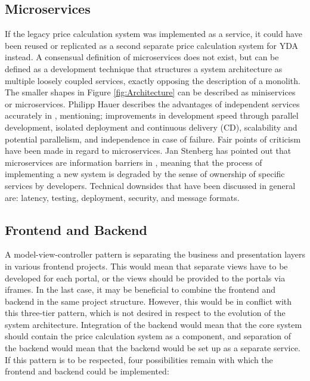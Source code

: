 \subsection{Microservices}


If the legacy price calculation system was implemented as a service, it could have been reused or replicated as a second separate price calculation system for YDA instead. A consensual definition of microservices does not exist, but can be defined as a development technique that structures a system architecture as multiple loosely coupled services, exactly opposing the description of a monolith. The smaller shapes in Figure \ref{fig:Architecture} can be described as miniservices or microservices. Philipp Hauer describes the advantages of independent services accurately in \cite{microservices}, mentioning; improvements in development speed through parallel development, isolated deployment and continuous delivery (CD), scalability and potential parallelism, and independence in case of failure. Fair points of criticism have been made in regard to microservices. Jan Stenberg has pointed out that microservices are information barriers in \cite{JS-microservices}, meaning that the process of implementing a new system is degraded by the sense of ownership of specific services by developers. Technical downsides that have been discussed in general are: latency, testing, deployment, security, and message formats.

\subsection{Frontend and Backend}
A model-view-controller pattern is separating the business and presentation layers in various frontend projects. This would mean that separate views have to be developed for each portal, or the views should be provided to the portals via iframes. In the last case, it may be beneficial to combine the frontend and backend in the same project structure. However, this would be in conflict with this three-tier pattern, which is not desired in respect to the evolution of the system architecture. Integration of the backend would mean that the core system should contain the price calculation system as a component, and separation of the backend would mean that the backend would be set up as a separate service. If this pattern is to be respected, four possibilities remain with which the frontend and backend could be implemented:

